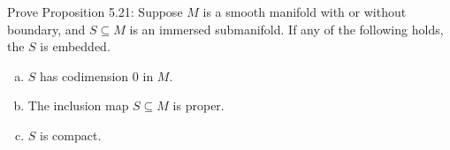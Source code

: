 Prove Proposition 5.21: Suppose $M$ is a smooth manifold with or without boundary, and $S \subseteq M$ is an immersed submanifold.  If any of the following holds, the $S$ is embedded.

\begin{enumerate}[a)]
\item $S$ has codimension $0$ in $M$.
\item The inclusion map $S \subseteq M$ is proper.
\item $S$ is compact.
\end{enumerate}